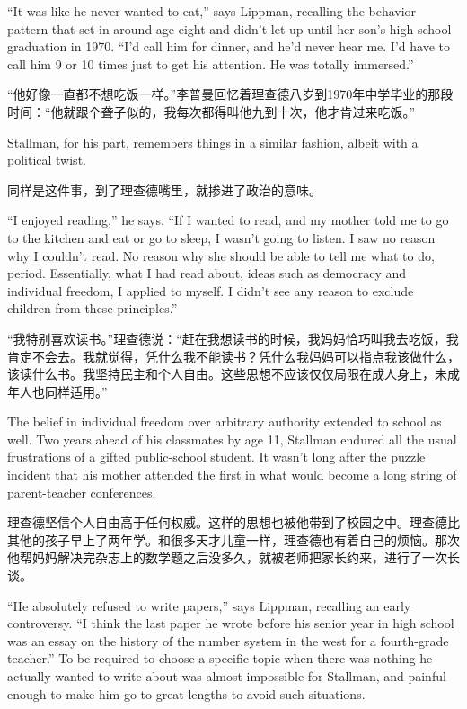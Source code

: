 \ifdefined\eng
``It was like he never wanted to eat,'' says Lippman, recalling the behavior pattern that set in around age eight and didn't let up until her son's high-school graduation in 1970. ``I'd call him for dinner, and he'd never hear me. I'd have to call him 9 or 10 times just to get his attention. He was totally immersed.''
\fi

\ifdefined\chs
“他好像一直都不想吃饭一样。”李普曼回忆着理查德八岁到1970年中学毕业的那段时间：“他就跟个聋子似的，我每次都得叫他九到十次，他才肯过来吃饭。”
\fi

\ifdefined\eng
Stallman, for his part, remembers things in a similar fashion, albeit with a political twist.
\fi

\ifdefined\chs
同样是这件事，到了理查德嘴里，就掺进了政治的意味。
\fi

\ifdefined\eng
``I enjoyed reading,'' he says. ``If I wanted to read, and my mother told me to go to the kitchen and eat or go to sleep, I wasn't going to listen. I saw no reason why I couldn't read. No reason why she should be able to tell me what to do, period. Essentially, what I had read about, ideas such as democracy and individual freedom, I applied to myself. I didn't see any reason to exclude children from these principles.''
\fi

\ifdefined\chs
“我特别喜欢读书。”理查德说：“赶在我想读书的时候，我妈妈恰巧叫我去吃饭，我肯定不会去。我就觉得，凭什么我不能读书？凭什么我妈妈可以指点我该做什么，该读什么书。我坚持民主和个人自由。这些思想不应该仅仅局限在成人身上，未成年人也同样适用。”
\fi

\ifdefined\eng
The belief in individual freedom over arbitrary authority extended to school as well. Two years ahead of his classmates by age 11, Stallman endured all the usual frustrations of a gifted public-school student. It wasn't long after the puzzle incident that his mother attended the first in what would become a long string of parent-teacher conferences.
\fi

\ifdefined\chs
理查德坚信个人自由高于任何权威。这样的思想也被他带到了校园之中。理查德比其他的孩子早上了两年学。和很多天才儿童一样，理查德也有着自己的烦恼。那次他帮妈妈解决完杂志上的数学题之后没多久，就被老师把家长约来，进行了一次长谈。
\fi

\ifdefined\eng
``He absolutely refused to write papers,'' says Lippman, recalling an early controversy. ``I think the last paper he wrote before his senior year in high school was an essay on the history of the number system in the west for a fourth-grade teacher.''  To be required to choose a specific topic when there was nothing he actually wanted to write about was almost impossible for Stallman, and painful enough to make him go to great lengths to avoid such situations.
\fi

